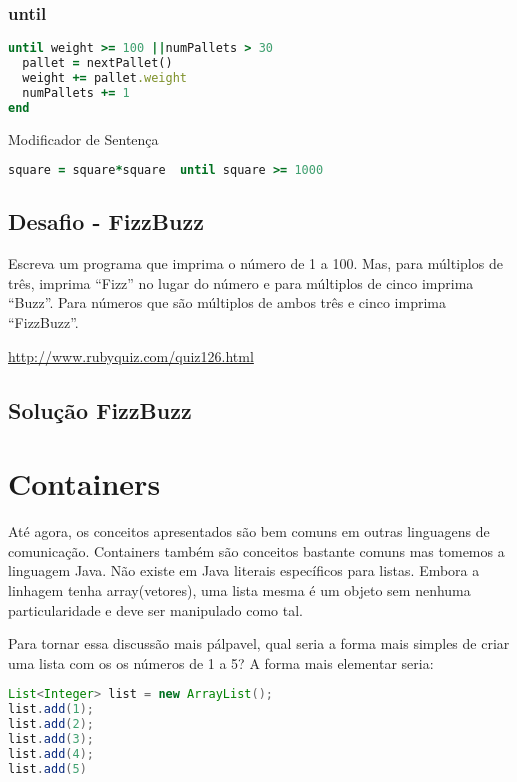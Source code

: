 \documentclass[serif,mathserif]{book}
\begin{document}
\subsection{until} 
\begin{lstlisting}[language=ruby]
until weight >= 100 ||numPallets > 30
  pallet = nextPallet()
  weight += pallet.weight
  numPallets += 1
end
\end{lstlisting}

Modificador de Sentença

\begin{lstlisting}[language=ruby]
square = square*square  until square >= 1000
\end{lstlisting}

\section{Desafio - FizzBuzz}  
Escreva um programa que imprima o número de 1 a 100.
Mas, para múltiplos de três, imprima  ``Fizz'' no lugar do
número e para múltiplos de cinco imprima ``Buzz''. Para
números que são múltiplos de ambos três e cinco
imprima ``FizzBuzz''.
 
\url{http://www.rubyquiz.com/quiz126.html}

\section{Solução FizzBuzz}



\chapter{Containers}

Até agora, os conceitos apresentados são bem comuns em outras linguagens de comunicação. Containers também são
conceitos bastante comuns mas tomemos a linguagem Java. Não existe em Java literais específicos para 
listas. Embora a linhagem tenha array(vetores), uma lista mesma é um objeto sem nenhuma particularidade e
deve ser manipulado como tal.

Para tornar essa discussão mais pálpavel, qual seria a forma mais simples de criar uma lista com os os números de 
1 a 5? A forma mais elementar seria:
\begin{lstlisting}[language=Java]
List<Integer> list = new ArrayList();
list.add(1);
list.add(2);
list.add(3);
list.add(4);
list.add(5)
\end{lstlisting}
\end{document}

